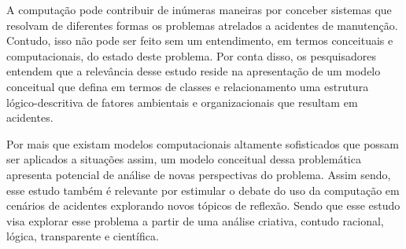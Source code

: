 A computação pode contribuir de inúmeras maneiras por conceber sistemas que resolvam de diferentes formas os problemas atrelados a acidentes de manutenção. Contudo, isso não pode ser feito sem um entendimento, em termos conceituais e computacionais, do estado deste problema. Por conta disso, os pesquisadores entendem que a relevância desse estudo reside na apresentação de um modelo conceitual que defina em termos de classes e relacionamento uma estrutura lógico-descritiva de fatores ambientais e organizacionais que resultam em acidentes. 

Por mais que existam modelos computacionais altamente sofisticados que possam ser aplicados a situações assim, um modelo conceitual dessa problemática apresenta potencial de análise de novas perspectivas do problema. Assim sendo, esse estudo também é relevante por estimular o debate do uso da computação em cenários de acidentes explorando novos tópicos de reflexão. Sendo que esse estudo visa explorar esse problema a partir de uma análise criativa, contudo racional, lógica, transparente e científica. 
